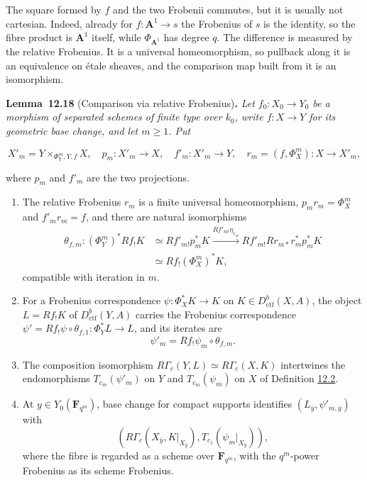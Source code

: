\documentclass[11pt]{article}
\newenvironment{bpstatement}[2]{\par\addvspace{0.6\baselineskip}\noindent\textbf{#1}#2\textbf{.}\enspace\ignorespaces}
  {\par\addvspace{0.4\baselineskip}}
\newenvironment{bpstatementit}[2]{\begin{bpstatement}{#1}{#2}\itshape\ignorespaces}{\end{bpstatement}}
\begin{document}
The square formed by \(f\) and the two Frobenii commutes, but it is usually not cartesian. Indeed, already for \(f:\mathbf A^1\to s\) the Frobenius of \(s\) is the identity, so the fibre product is \(\mathbf A^1\) itself, while \(\Phi_{\mathbf A^1}\) has degree \(q\). The difference is measured by the relative Frobenius. It is a universal homeomorphism, so pullback along it is an equivalence on étale sheaves, and the comparison map built from it is an isomorphism.

\label{bp280}%
\begin{bpstatementit}{Lemma~12.18}{ (Comparison via relative Frobenius)}
Let \(f_0:X_0\to Y_0\) be a morphism of separated schemes of finite type over \(k_0\), write \(f:X\to Y\) for its geometric base change, and let \(m\geq1\). Put

\[
X'_m=Y\times_{\Phi_Y^m,Y,f}X,
\quad p_m:X'_m\to X,\quad f'_m:X'_m\to Y,
\quad r_m=(f,\Phi_X^m):X\to X'_m,
\]

where \(p_m\) and \(f'_m\) are the two projections.

\begin{enumerate}
\item The relative Frobenius \(r_m\) is a finite universal homeomorphism, \(p_mr_m=\Phi_X^m\) and \(f'_mr_m=f\), and there are natural isomorphisms \[
   \begin{aligned}
   \theta_{f,m}:(\Phi_Y^m)^*Rf_!K
   &\simeq Rf'_{m!}p_m^*K
   \xrightarrow{Rf'_{m!}\eta_{r_m}}
   Rf'_{m!}Rr_{m*}r_m^*p_m^*K\\
   &\simeq Rf_!(\Phi_X^m)^*K,
   \end{aligned}
   \] compatible with iteration in \(m\).
\item For a Frobenius correspondence \(\psi:\Phi_X^*K\to K\) on \(K\in D^b_{\mathrm{ctf}}(X,A)\), the object \(L=Rf_!K\) of \(D^b_{\mathrm{ctf}}(Y,A)\) carries the Frobenius correspondence \(\psi'=Rf_!\psi\circ\theta_{f,1}:\Phi_Y^*L\to L\), and its iterates are \[
   \psi'_m=Rf_!\psi_m\circ\theta_{f,m}.
   \]
\item The composition isomorphism \(R\Gamma_c(Y,L)\simeq R\Gamma_c(X,K)\) intertwines the endomorphisms \(T_{c_m}(\psi'_m)\) on \(Y\) and \(T_{c_m}(\psi_m)\) on \(X\) of Definition \hyperref[bp232]{12.2}.
\item At \(y\in Y_0(\mathbf F_{q^m})\), base change for compact supports identifies \((L_{\bar y},\psi'_{m,\bar y})\) with \[
   \left(R\Gamma_c(X_{\bar y},K|_{X_{\bar y}}),
   T_{c_1}(\psi_m|_{X_{\bar y}})\right),
   \] where the fibre is regarded as a scheme over \(\mathbf F_{q^m}\), with the \(q^m\)-power Frobenius as its scheme Frobenius.
\end{enumerate}
\end{bpstatementit}
\end{document}
